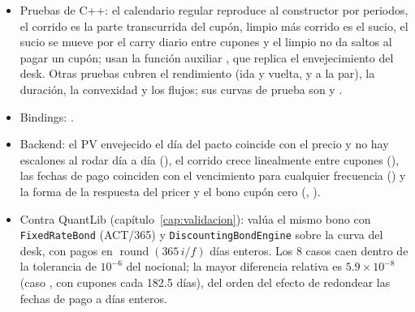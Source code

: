 \begin{itemize}
  \item Pruebas de C++: el calendario regular reproduce al constructor por periodos, el corrido es la parte
        transcurrida del cupón, limpio más corrido es el sucio, el sucio se mueve por el carry diario entre
        cupones y el limpio no da saltos al pagar un cupón; usan la función auxiliar
        , que replica el envejecimiento del desk. Otras pruebas
        cubren el rendimiento (ida y vuelta, y a la par), la duración, la convexidad y los flujos; sus curvas de
        prueba son  y
        .
  \item Bindings:
        .
  \item Backend: el PV envejecido el día del pacto coincide con el precio y no hay escalones al rodar día a día
        (),
        el corrido crece linealmente entre cupones
        (),
        las fechas de pago coinciden con el vencimiento para cualquier frecuencia
        ()
        y la forma de la respuesta del pricer y el bono cupón cero
        (,
        ).
  \item Contra QuantLib (capítulo~\ref{cap:validacion}):  valúa
        el mismo bono con \texttt{FixedRateBond} (ACT/365) y \texttt{DiscountingBondEngine} sobre la curva del
        desk, con pagos en $\operatorname{round}(365\,i/f)$ días enteros. Los 8 casos caen dentro de la
        tolerancia de $10^{-6}$ del nocional; la mayor diferencia relativa es $5.9\times10^{-8}$ (caso
        , con cupones cada 182.5 días), del orden del efecto de
        redondear las fechas de pago a días enteros.
\end{itemize}

